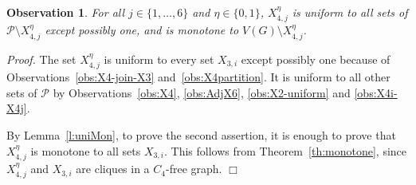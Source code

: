 \documentclass[12pt]{article}
\newtheorem{Observation}[Theorem]{Observation}
\newcommand{\qed}{\hfill $\Box$}
\begin{document}
	\begin{Observation}\label{obs:X4Mon}
		For all $j \in \{1, \dots, 6\}$ and $\eta\in \{0, 1\}$, $X_{4,j}^\eta$ is uniform to all sets of $\mathcal P\setminus X_{4,j}^\eta$  except possibly one, and is monotone to $V(G) \setminus X_{4,j}^\eta$.
	\end{Observation}
	{\it Proof.}  
	The set $X_{4,j}^\eta$ is uniform to every set $X_{3, i}$ except possibly one because of Observations~\ref{obs:X4-join-X3} and~\ref{obs:X4partition}. It is uniform to all other sets of $\mathcal P$ by Observations~\ref{obs:X4}, \ref{obs:AdjX6}, \ref{obs:X2-uniform} and \ref{obs:X4i-X4j}. 
	
	By Lemma~\ref{l:uniMon}, to prove the second assertion, it is enough to prove that $X_{4,j}^\eta$  is monotone to all sets  $X_{3,i}$. This follows from Theorem~\ref{th:monotone}, since $X_{4,j}^\eta$ and $X_{3,i}$ are cliques in a $C_4$-free graph. 
	\qed 
	
\end{document}
